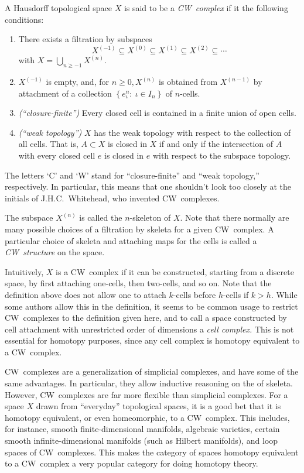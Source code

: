 \documentclass[12pt]{article}
\newcommand{\set}[1]{{\left\{#1\right\}}}
\begin{document}
\newcommand{\skel}[2]{{#1}^{(#2)}}

A Hausdorff topological space $X$ is said to be a {\em CW~complex\/} if it  the following conditions:
\begin{enumerate}
\item
There exists a filtration by subspaces
\[\skel{X}{-1}\subseteq\skel{X}{0}\subseteq \skel{X}{1}\subseteq \skel{X}{2}\subseteq\cdots \]
with $X=\bigcup\limits_{n\ge -1} \skel{X}{n}.$

\item
$\skel{X}{-1}$ is empty, and, for $n\ge 0, \skel{X}{n}$ is obtained
from $\skel{X}{n-1}$ by attachment of a collection $\set{e_\iota^n:\:\iota\in I_n}$ of $n$-cells.

\item {\em (``closure-finite'')\/}
Every closed cell is contained in a finite union of open cells.

\item {\em (``weak topology'')\/}
$X$ has the weak topology with respect to the collection of all cells.
That is, $A\subset X$ is closed in $X$ if and only if the intersection of $A$
with every closed cell $e$ is closed in $e$ with respect to the subspace topology. 
\end{enumerate}

The letters `C' and `W' stand for ``closure-finite'' and ``weak topology,'' respectively. In particular, this means that one shouldn't look too closely at
the initials of J.H.C.~Whitehead, who invented CW~complexes.

The subspace $\skel{X}{n}$ is called the $n$-skeleton of $X.$ Note that there normally are many possible choices of a filtration by skeleta for a given CW~complex. A particular choice of skeleta and attaching maps for the cells is called a {\em CW~structure\/} on the space.

Intuitively, $X$ is a CW~complex if it can be constructed, starting from a discrete space, by first attaching one-cells, then two-cells, and so on. Note that the definition above does not allow one to attach $k$-cells before $h$-cells if $k>h.$ While some authors allow this in the definition, it seems to be common usage to restrict CW~complexes to the definition given here, and to call a space constructed by cell attachment with unrestricted order of dimensions a {\em cell complex.} This is not essential for homotopy purposes, since any cell complex is homotopy equivalent to a CW~complex.

CW~complexes are a generalization of simplicial complexes, and have some of the same advantages. In particular, they allow inductive reasoning on the  of skeleta. However, CW~complexes are far more flexible than simplicial complexes. For a space $X$ drawn from ``everyday'' topological spaces, it is a good bet that it is homotopy equivalent, or even homeomorphic, to a CW~complex. This includes, for instance, smooth finite-dimensional manifolds, algebraic varieties, certain smooth infinite-dimensional manifolds (such as Hilbert manifolds), and loop spaces of CW~complexes. This makes the category of spaces homotopy equivalent to a CW~complex a very popular category for doing homotopy theory.
\end{document}
